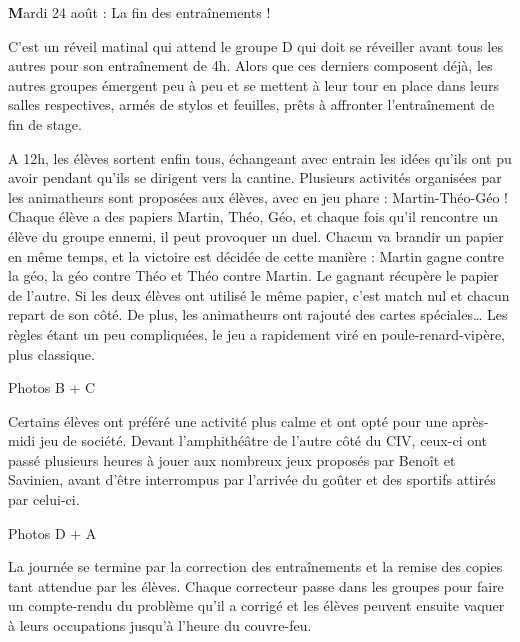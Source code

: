 \begin{center}
{\textbf Mardi 24 août : La fin des entraînements !}
\end{center}
\vspace{2mm}

C’est un réveil matinal qui attend le groupe D qui doit se réveiller avant tous les autres pour son entraînement de 4h. Alors que ces derniers composent déjà, les autres groupes émergent peu à peu et se mettent à leur tour en place dans leurs salles respectives, armés de stylos et feuilles, prêts à affronter l’entraînement de fin de stage. 

A 12h, les élèves sortent enfin tous, échangeant avec entrain les idées qu’ils ont pu avoir pendant qu’ils se dirigent vers la cantine. Plusieurs activités organisées par les animatheurs sont proposées aux élèves, avec en jeu phare : Martin-Théo-Géo ! Chaque élève a des papiers Martin, Théo, Géo, et chaque fois qu’il rencontre un élève du groupe ennemi, il peut provoquer un duel. Chacun va brandir un papier en même temps, et la victoire est décidée de cette manière : Martin gagne contre la géo, la géo contre Théo et Théo contre Martin. Le gagnant récupère le papier de l’autre. Si les deux élèves ont utilisé le même papier, c’est match nul et chacun repart de son côté. De plus, les animatheurs ont rajouté des cartes spéciales… Les règles étant un peu compliquées, le jeu a rapidement viré en poule-renard-vipère, plus classique. 

Photos B + C

Certains élèves ont préféré une activité plus calme et ont opté pour une après-midi jeu de société. Devant l’amphithéâtre de l’autre côté du CIV, ceux-ci ont passé plusieurs heures à jouer aux nombreux jeux proposés par Benoît et Savinien, avant d’être interrompus par l’arrivée du goûter et des sportifs attirés par celui-ci.

Photos D + A

La journée se termine par la correction des entraînements et la remise des copies tant attendue par les élèves. Chaque correcteur passe dans les groupes pour faire un compte-rendu du problème qu’il a corrigé et les élèves peuvent ensuite vaquer à leurs occupations jusqu’à l’heure du couvre-feu.
